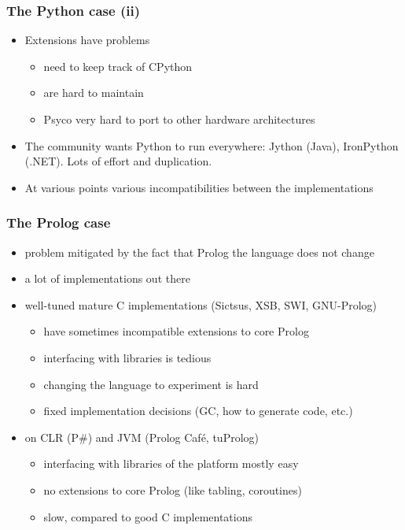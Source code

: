 \documentclass[utf8]{beamer}
\begin{document}
\begin{frame}
  \frametitle{The Python case (ii)}
  \begin{itemize}
  \item
    Extensions have problems
    \begin{itemize}
    \item
      need to keep track of CPython
    \item
      are hard to maintain
    \item
      Psyco very hard to port to other hardware architectures
    \end{itemize}
  \item
    The community wants Python to run everywhere:
    Jython (Java), IronPython (.NET).
    Lots of effort and duplication.

  \item
    At various points various incompatibilities between
    the implementations

  \end{itemize}
\end{frame}


\begin{frame}
  \frametitle{The Prolog case}
  \begin{itemize}
  \item
    problem mitigated by the fact that Prolog the language does not change
  \item
    a lot of implementations out there
  \item
    well-tuned mature C implementations (Sictsus, XSB, SWI, GNU-Prolog)
    \begin{itemize}
    \item
      have sometimes incompatible extensions to core Prolog
    \item
      interfacing with libraries is tedious
    \item
      changing the language to experiment is hard
    \item
      fixed implementation decisions (GC, how to generate code, etc.)
    \end{itemize}
  \item
    on CLR (P\#) and JVM (Prolog Café, tuProlog)
    \begin{itemize}
    \item
      interfacing with libraries of the platform mostly easy
    \item
      no extensions to core Prolog (like tabling, coroutines)
    \item
      slow, compared to good C implementations
    \end{itemize}
  \end{itemize}
\end{frame}
\end{document}
